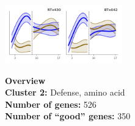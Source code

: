 \begin{multicols}{2}
\includegraphics[width=2in]{figures/clusters/root_Preflowering_1.png}
\columnbreak

\noindent \textbf{Overview}\\\textbf{Cluster 2:} Defense, amino acid \\
\textbf{Number of genes:} 526 \\
\textbf{Number of ``good'' genes:} 350 \\
\end{multicols}

